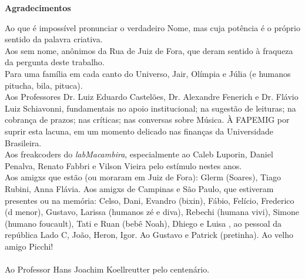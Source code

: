 \newpage
\begin{flushright}
\huge{\textbf{Agradecimentos}}

\small{Ao que é impossível pronunciar o verdadeiro Nome, mas cuja potência é o próprio sentido da palavra criativa.
\ \\
Aos sem nome, anônimos da Rua de Juiz de Fora, que deram sentido à fraqueza da pergunta deste trabalho.
\ \\
Para uma família em cada canto do Universo, Jair, Olímpia e Júlia (e humanos pitucha, bila, pituca). 
\ \\
Aos Professores Dr. Luiz Eduardo Castelões, Dr. Alexandre Fenerich e Dr. Flávio Luiz Schiavonni, fundamentais no apoio institucional; na sugestão de leituras; na cobrança de prazos; nas críticas; nas conversas sobre Música. À FAPEMIG por suprir esta lacuna, em um momento delicado nas finanças da Universidade Brasileira.
\ \\
Aos freakcoders do \emph{labMacambira}, especialmente ao Caleb Luporin, Daniel Penalva, Renato Fabbri e Vilson Vieira pelo estímulo nestes anos. 
\ \\
Aos amigxs que estão (ou moraram em Juiz de Fora): Glerm (Soares), Tiago Rubini, Anna Flávia. Aos amigxs de Campinas e São Paulo, que estiveram presentes ou na memória: Celso, Dani, Evandro (bixin), Fábio, Felício, Frederico (d menor), Gustavo, Larissa (humanos zé e diva), Rebechi (humana vivi), Simone (humano foucault), Tati e Ruan (bebê Noah), Dhiego e Luisa , ao pessoal da república Lado C, João, Heron, Igor.  Ao Gustavo e Patrick (pretinha). Ao velho amigo Picchi!
\ \\
\ \\
Ao Professor Hans Joachim Koellreutter pelo centenário.}
\end{flushright}

\vfil \ 

\newpage